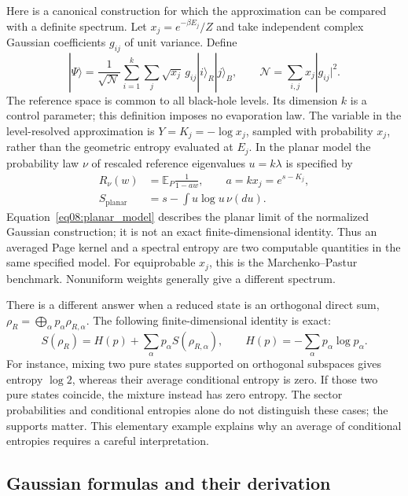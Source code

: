 \documentclass[11pt,letterpaper]{article}
\theoremstyle{plain}
\theoremstyle{definition}
\theoremstyle{remark}
\begin{document}
Here is a canonical construction for which the approximation can be compared
with a definite spectrum. Let $x_j=e^{-\beta E_j}/Z$ and take independent
complex Gaussian coefficients $g_{ij}$ of unit variance. Define
\begin{equation}
 |\Psi\rangle=\frac{1}{\sqrt{\mathcal N}}
  \sum_{i=1}^k\sum_j\sqrt{x_j}\,g_{ij}|i\rangle_R|j\rangle_B,
 \qquad \mathcal N=\sum_{i,j}x_j|g_{ij}|^2.
 \label{eq08:canonical_state}
\end{equation}
The reference space is common to all black-hole levels. Its dimension $k$ is
a control parameter; this definition imposes no evaporation law. The variable
in the level-resolved approximation is $Y=K_j=-\log x_j$, sampled with
probability $x_j$, rather than the geometric entropy evaluated at $E_j$.
In the planar model the probability law $\nu$ of rescaled reference
eigenvalues $u=k\lambda$ is specified by
\begin{align}
 R_\nu(w)&=\mathbb E_P\frac{1}{1-aw},\qquad a=kx_j=e^{s-K_j},\nonumber\\
 S_{\mathrm{planar}}&=s-\int u\log u\,\nu(du).
 \label{eq08:planar_model}
\end{align}
Equation~\eqref{eq08:planar_model} describes the planar limit of the normalized
Gaussian construction; it is not an exact finite-dimensional identity.
Thus an averaged Page kernel and a spectral entropy are two computable
quantities in the same specified model. For equiprobable $x_j$, this is the
Marchenko--Pastur benchmark. Nonuniform weights generally give a different
spectrum.

There is a different answer when a reduced state is an orthogonal direct sum,
$\rho_R=\bigoplus_\alpha p_\alpha\rho_{R,\alpha}$. The following
finite-dimensional identity is exact:
\begin{equation}
 S(\rho_R)=H(p)+\sum_\alpha p_\alpha S(\rho_{R,\alpha}),
 \qquad H(p)=-\sum_\alpha p_\alpha\log p_\alpha.
 \label{eq08:sector_entropy}
\end{equation}
For instance, mixing two pure states supported on orthogonal subspaces gives
entropy $\log2$, whereas their average conditional entropy is zero. If those
two pure states coincide, the mixture instead has zero entropy. The sector
probabilities and conditional entropies alone do not distinguish these cases;
the supports matter. This elementary example explains why an average of
conditional entropies requires a careful interpretation.

\subsection{Gaussian formulas and their derivation}
\label{subsec08:closed_form}
\end{document}
